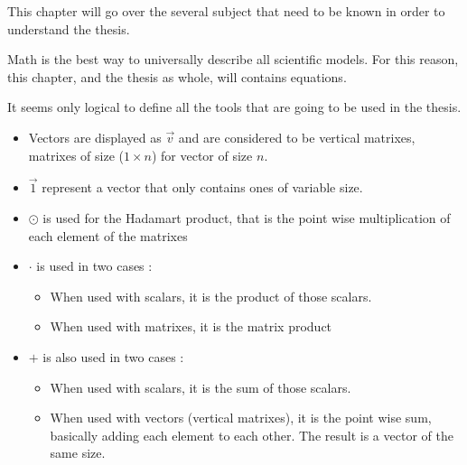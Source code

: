 \label{cap:state}

This chapter will go over the several subject that need to be known in order to understand the thesis.

Math is the best way to universally describe all scientific models. For this reason, this chapter, and the thesis as whole, will contains equations.

It seems only logical to define all the tools that are going to be used in the thesis.

\begin{itemize}
  \item Vectors are displayed as $\overrightarrow{v}$ and are considered to be vertical matrixes, matrixes of size ($1\times n$) for vector of size $n$.
  \item $\overrightarrow{1}$ represent a vector that only contains ones of variable size.
  \item $\odot$ is used for the Hadamart product, that is the point wise multiplication of each element of the matrixes
  \item $\cdot$ is used in two cases :
    \begin{itemize}
      \item When used with scalars, it is the product of those scalars.
      \item When used with matrixes, it is the matrix product
    \end{itemize}
  \item $+$ is also used in two cases :
    \begin{itemize}
      \item When used with scalars, it is the sum of those scalars.
      \item When used with vectors (vertical matrixes), it is the point wise sum, basically adding each element to each other. The result is a vector of the same size.
    \end{itemize}
\end{itemize}











\cleardoublepage

